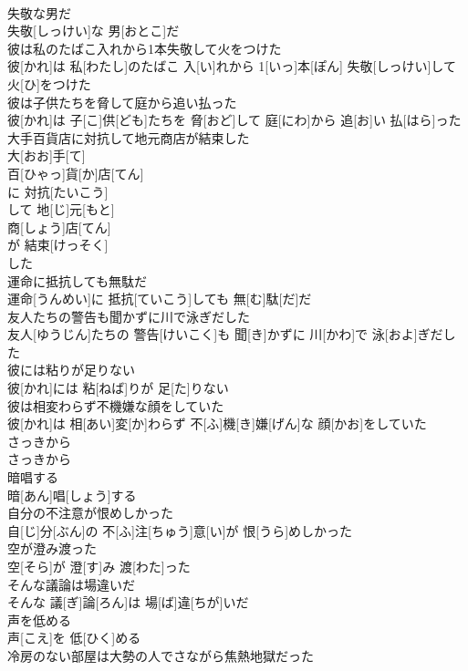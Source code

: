 \documentclass[8pt]{extreport}
\begin{document}
\begin{CJK}{UTF8}{min}
\\	失敬な男だ	
\\	失敬[しっけい]な 男[おとこ]だ
\\	彼は私のたばこ入れから1本失敬して火をつけた	
\\	彼[かれ]は 私[わたし]のたばこ 入[い]れから 1[いっ]本[ぽん] 失敬[しっけい]して 火[ひ]をつけた
\\	彼は子供たちを脅して庭から追い払った	
\\	彼[かれ]は 子[こ]供[ども]たちを 脅[おど]して 庭[にわ]から 追[お]い 払[はら]った
\\	大手百貨店に対抗して地元商店が結束した	
\\	大[おお]手[て]
\\	百[ひゃっ]貨[か]店[てん]
\\	に 対抗[たいこう]
\\	して 地[じ]元[もと]
\\	商[しょう]店[てん]
\\	が 結束[けっそく]
\\	した
\\	運命に抵抗しても無駄だ	
\\	運命[うんめい]に 抵抗[ていこう]しても 無[む]駄[だ]だ
\\	友人たちの警告も聞かずに川で泳ぎだした	
\\	友人[ゆうじん]たちの 警告[けいこく]も 聞[き]かずに 川[かわ]で 泳[およ]ぎだした
\\	彼には粘りが足りない	
\\	彼[かれ]には 粘[ねば]りが 足[た]りない
\\	彼は相変わらず不機嫌な顔をしていた	
\\	彼[かれ]は 相[あい]変[か]わらず 不[ふ]機[き]嫌[げん]な 顔[かお]をしていた
\\	さっきから	
\\	さっきから
\\	暗唱する	
\\	暗[あん]唱[しょう]する
\\	自分の不注意が恨めしかった	
\\	自[じ]分[ぶん]の 不[ふ]注[ちゅう]意[い]が 恨[うら]めしかった
\\	空が澄み渡った	
\\	空[そら]が 澄[す]み 渡[わた]った
\\	そんな議論は場違いだ	
\\	そんな 議[ぎ]論[ろん]は 場[ば]違[ちが]いだ
\\	声を低める	
\\	声[こえ]を 低[ひく]める
\\	冷房のない部屋は大勢の人でさながら焦熱地獄だった	

\end{CJK}
\end{document}
